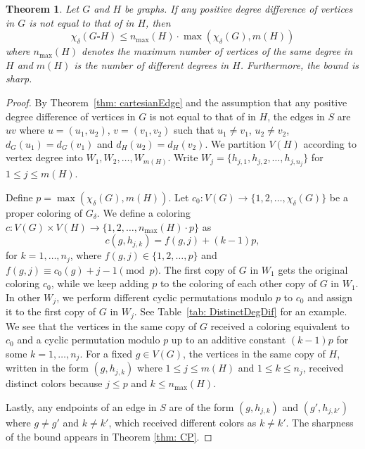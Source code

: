 \documentclass[12pt]{amsart}
\newtheorem{theorem}{Theorem}
\begin{document}
\begin{theorem}\label{thm: DistinctDegDif}
Let $G$ and $H$ be graphs. If any positive degree difference of vertices in $G$ is not equal to that of in $H$, then
    \[
    \chi_\delta(G\square H) \leq n_{\max}(H)\cdot \max( \chi_\delta(G) , m(H) )
    \]
    where $n_{\max}(H)$ denotes the maximum number of vertices of the same degree in $H$ and $m(H)$ is the number of different degrees in $H$. 
    Furthermore, the bound is sharp.
\end{theorem}
\begin{proof}
    By Theorem~\ref{thm: cartesianEdge} and the assumption that any positive degree difference of vertices in $G$ is not equal to that of in $H$, the edges in $S$ are $uv$ where $u=(u_1,u_2)$, $v=(v_1,v_2)$ such that $u_1\neq v_1$, $u_2\neq v_2$, $d_G(u_1)=d_G(v_1)$ and $d_H(u_2)=d_H(v_2)$.
    We partition $V(H)$ according to vertex degree into $W_1, W_2, \dots, W_{m(H)}$.
    Write $W_j = \{h_{j,1}, h_{j,2}, \dots, h_{j,n_j} \}$  for $1\leq j\leq m(H)$.

    Define $p=\max( \chi_\delta(G) , m(H) )$.
    Let $c_0:V(G)\to \{1,2,\dots,\chi_\delta(G)\}$ be a proper coloring of $G_\delta$.
    We define a coloring $c : V(G)\times V(H) \to \{1,2,\dots, n_{\max}(H)\cdot p\}$ as 
    \[ c(g, h_{j,k}) = f(g,j) + (k-1)p, \]
    for $k=1,\dots,n_j$, 
    where $f(g,j)\in\{1,2,\dots,p\}$ and $f(g,j) \equiv c_0(g) + j - 1 \pmod p$.
    The first copy of $G$ in $W_1$ gets the original coloring $c_0$, while we keep adding $p$ to the coloring of each other copy of $G$ in $W_1$.
    In other $W_j$, we perform different cyclic permutations modulo $p$ to $c_0$ and assign it to the first copy of $G$ in $W_j$.
    See Table~\ref{tab: DistinctDegDif} for an example.
    We see that the vertices in the same copy of $G$ received a coloring equivalent to $c_0$ and a cyclic permutation modulo $p$ up to an additive constant $(k-1)p$ for some $k=1,\dots,n_j$.
    For a fixed $g\in V(G)$, the vertices in the same copy of $H$, written in the form $(g,h_{j,k})$ where $1\leq j\leq m(H)$ and $1\leq k \leq n_j $, received distinct colors because $j \leq p$ and $k\leq n_{\max}(H)$.
    
    Lastly, any endpoints of an edge in $S$ are of the form $(g, h_{j,k})$ and $(g', h_{j,k'})$ where $g\neq g'$ and $k\neq k'$, which received different colors as $k\neq k'$. 
    The sharpness of the bound appears in Theorem \ref{thm: CP}.
\end{proof}
\end{document}
